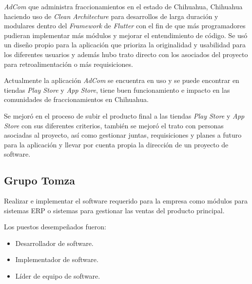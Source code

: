 \documentclass[protocolo.tex]{subfiles}
\begin{document}
\begin{enumerate}
\textit{AdCom} que administra fraccionamientos en el estado de Chihuahua,
Chihuahua haciendo uso de \textit{Clean Architecture} para desarrollos de larga duración y modulares
dentro del \textit{Framework} de \textit{Flutter} con el fin de que más programadores pudieran
implementar más módulos y mejorar el entendimiento de código. Se usó un diseño propio
para la aplicación que prioriza la originalidad y usabilidad para los diferentes usuarios y además hubo
trato directo con los asociados del proyecto para retroalimentación o más requisiciones.


Actualmente la aplicación \textit{AdCom} se encuentra en uso y se puede encontrar en tiendas \textit{Play
Store} y \textit{App Store}, tiene buen funcionamiento e impacto en las comunidades de
fraccionamientos en Chihuahua.

Se mejoró en el proceso de subir el producto final a las tiendas \textit{Play Store} y \textit{App Store} con
sus diferentes criterios, también se mejoró el trato con personas asociadas al proyecto, así como
gestionar juntas, requisiciones y planes a futuro para la aplicación y llevar por cuenta propia la dirección de un proyecto de software.

\end{enumerate}


\subsection{Grupo Tomza}

Realizar e implementar el software requerido para la empresa como módulos para
sistemas ERP o sistemas para gestionar las ventas del producto principal.\vspace{5mm}

Los puestos desempeñados fueron:

\begin{itemize}
\item Desarrollador de software.
\item Implementador de software.
\item Líder de equipo de software.
\end{itemize}
\end{document}
